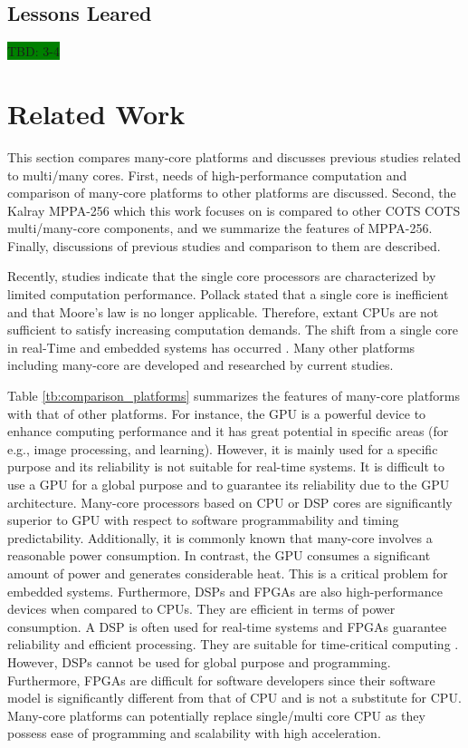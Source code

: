\documentclass[conference,compsoc]{IEEEtran}
\begin{document}
\subsection{Lessons Leared}
\label{sec:lessons}
\colorbox{green}{TBD: 3-4}

\section{Related Work}
\label{sec:related_work}
This section compares many-core platforms and discusses previous studies related to multi/many cores.
First, needs of high-performance computation and comparison of many-core platforms to other platforms are discussed.
Second, the Kalray MPPA-256 which this work focuses on is compared to other COTS COTS multi/many-core components, and we summarize the features of MPPA-256.
Finally, discussions of previous studies and comparison to them are described.

Recently, studies indicate that the single core processors are characterized by limited computation performance.
Pollack stated that a single core is inefficient \cite{pollack1999new} and that Moore's law \cite{moore2006cramming} is no longer applicable. 
Therefore, extant CPUs are not sufficient to satisfy increasing computation demands.
The shift from a single core in real-Time and embedded systems has occurred \cite{saidi2015shift}. 
Many other platforms including many-core are developed and researched by current studies.

Table \ref{tb:comparison_platforms} summarizes the features of many-core platforms with that of other platforms.
For instance, the GPU is a powerful device to enhance computing performance and it has great potential in specific areas (for e.g., image processing, and learning).
However, it is mainly used for a specific purpose and its reliability is not suitable for real-time systems.
It is difficult to use a GPU for a global purpose and to guarantee its reliability due to the GPU architecture.
Many-core processors based on CPU or DSP cores are significantly superior to GPU with respect to software programmability and timing predictability.
Additionally, it is commonly known that many-core involves a reasonable power consumption.
In contrast, the GPU consumes a significant amount of power and generates considerable heat.
This is a critical problem for embedded systems.
Furthermore, DSPs and FPGAs are also high-performance devices when compared to CPUs.
They are efficient in terms of power consumption.
A DSP is often used for real-time systems and FPGAs guarantee reliability and efficient processing.
They are suitable for time-critical computing \cite{de2015kalray}.
However, DSPs cannot be used for global purpose and programming.
Furthermore, FPGAs are difficult for software developers since their software model is significantly different from that of CPU and is not a substitute for CPU.
Many-core platforms can potentially replace single/multi core CPU as they possess ease of programming and scalability with high acceleration.
\end{document}
